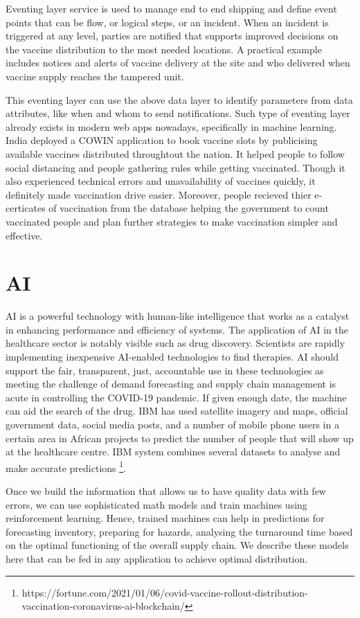 \documentclass{article}
\begin{document}
Eventing layer service is used to manage end to end shipping and define event points that can be flow, or logical steps, or an incident. When an incident is triggered at any level, parties are notified that supports improved decisions on the vaccine distribution to the most needed locations. A practical example includes notices and alerts of vaccine delivery at the site and who delivered when vaccine supply reaches the tampered unit.

This eventing layer can use the above data layer to identify parameters from data attributes, like when and whom to send notifications. Such type of eventing layer already exists in modern web apps nowadays, specifically in machine learning. India deployed a COWIN application to book vaccine slots by publicising available vaccines distributed throughtout the nation. It helped people to follow social distancing and people gathering rules while getting vaccinated. Though it also experienced technical errors and unavailability of vaccines quickly, it definitely made vaccination drive easier. Moreover, people recieved thier e-certicates of vaccination from the database helping the government to count vaccinated people and plan further strategies to make vaccination simpler and effective.   

\section{AI}
AI is a powerful technology with human-like intelligence that works as a catalyst in enhancing performance and efficiency of systems. The application of AI in the healthcare sector is notably visible such as drug discovery. Scientists are rapidly implementing inexpensive AI-enabled technologies to find therapies. AI should support the fair, transparent, just, accountable use in these technologies as meeting the challenge of demand forecasting and supply chain management is acute in controlling the COVID-19 pandemic. If given enough date, the machine can aid the search of the drug\cite{keshavarzi2020artificial}. IBM has used satellite imagery and maps, official government data, social media posts, and a number of mobile phone users in a certain area in African projects to predict the number of people that will show up at the healthcare centre. IBM system combines several datasets to analyse and make accurate predictions \footnote{https://fortune.com/2021/01/06/covid-vaccine-rollout-distribution-vaccination-coronavirus-ai-blockchain/}.  

Once we build the information that allows us to have quality data with few errors, we can use sophisticated math models and train machines using reinforcement learning. Hence, trained machines can help in predictions for forecasting inventory, preparing for hazards, analysing the turnaround time based on the optimal functioning of the overall supply chain. We describe these models here that can be fed in any application to achieve optimal distribution.
\end{document}
